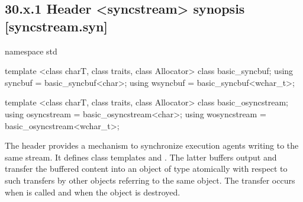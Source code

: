 \documentclass[ebook,11pt,article]{memoir}
\begin{document}
\subsection{30.x.1 Header <syncstream> synopsis [syncstream.syn]}
\begin{addedblock}
\begin{codeblock}
namespace std {
template <class charT,
          class traits,
          class Allocator>
  class basic_syncbuf;
using syncbuf  = basic_syncbuf<char>;
using wsyncbuf = basic_syncbuf<wchar_t>;

template <class charT,
          class traits,
          class Allocator>
  class basic_osyncstream;
using osyncstream = basic_osyncstream<char>;
using wosyncstream = basic_osyncstream<wchar_t>; 
}
\end{codeblock}
\end{addedblock}

\begin{addedblock}
\pnum
The header  provides a mechanism to synchronize execution agents writing to the same stream. 
It defines class templates  and . The latter buffers output and transfer the buffered content into an object of type  atomically with respect to such transfers by other  objects referring to the same  object. The transfer occurs when  is called and when the  object is destroyed.


\end{addedblock}
\end{document}
